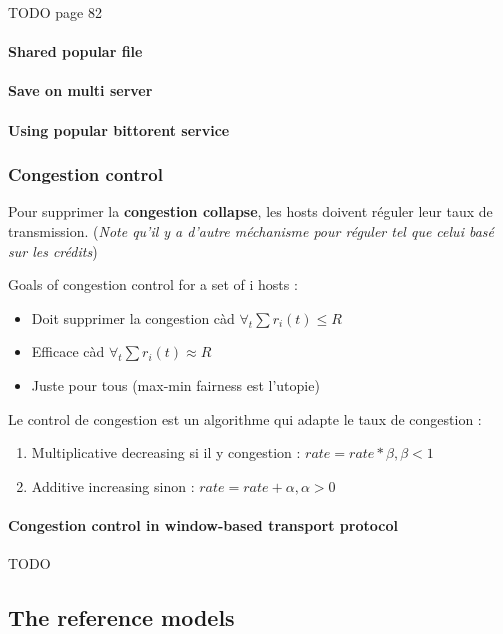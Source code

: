 TODO page 82


\paragraph{Shared popular file}

\paragraph{Save on multi server}

\paragraph{Using popular bittorent service}


\subsubsection{Congestion control}

Pour supprimer la \textbf{congestion collapse}, les hosts doivent réguler leur taux
de transmission. (\textit{Note qu'il y a d'autre méchanisme pour réguler tel que celui
basé sur les crédits})

Goals of congestion control for a set of i hosts :
\begin{itemize}
    \item Doit supprimer la congestion càd $\forall_t \sum r_i(t) \leq R$
    \item Efficace càd $\forall_t \sum r_i(t) \approx R$
    \item Juste pour tous (max-min fairness est l'utopie)
\end{itemize}

Le control de congestion est un algorithme qui adapte le taux de congestion :
\begin{enumerate}
    \item Multiplicative decreasing si il y congestion : $rate = rate*\beta, \beta <1$
    \item Additive increasing sinon :  $rate =  rate + \alpha, \alpha>0$
\end{enumerate}

\paragraph{Congestion control in window-based transport protocol}
TODO

\subsection{The reference models}

